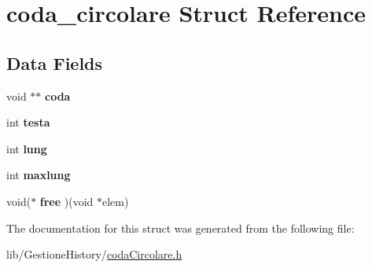 \hypertarget{structcoda__circolare}{}\section{coda\+\_\+circolare Struct Reference}
\label{structcoda__circolare}
\subsection*{Data Fields}
\begin{DoxyCompactItemize}
\item 
\mbox{\label{structcoda__circolare_a1333e9edea75af3faa285320913a59d2}} 
void $\ast$$\ast$ {\bfseries coda}
\item 
\mbox{\label{structcoda__circolare_a818bfdc927a2f6722ab45585b5ed0063}} 
int {\bfseries testa}
\item 
\mbox{\label{structcoda__circolare_a2fcb379c74e32fe78fee156d2455ff14}} 
int {\bfseries lung}
\item 
\mbox{\label{structcoda__circolare_a501e857ca58c4eaa1f3cd4fd7acb8f25}} 
int {\bfseries maxlung}
\item 
\mbox{\label{structcoda__circolare_ae7e4d4bbae949809f9dcc80be5d70e33}} 
void($\ast$ {\bfseries free} )(void $\ast$elem)
\end{DoxyCompactItemize}


The documentation for this struct was generated from the following file\+:\begin{DoxyCompactItemize}
\item 
lib/\+Gestione\+History/\hyperlink{coda_circolare_8h}{coda\+Circolare.\+h}\end{DoxyCompactItemize}
